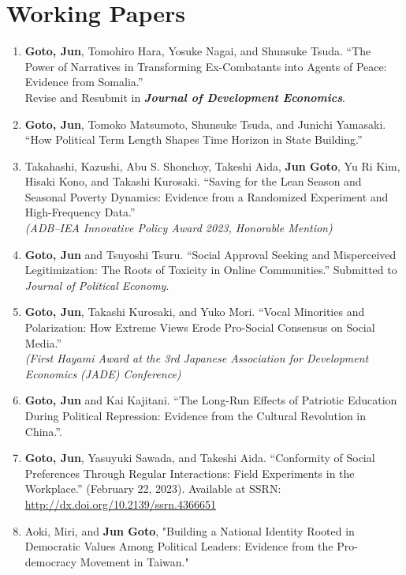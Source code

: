 \documentclass[12pt]{article}
\begin{document}
\section*{Working Papers}
\begin{enumerate}
    \item \textbf{Goto, Jun}, Tomohiro Hara, Yosuke Nagai, and Shunsuke Tsuda.
    ``The Power of Narratives in Transforming Ex-Combatants into Agents of Peace: Evidence from Somalia.'' \\
    Revise and Resubmit in \textbf{\textit{Journal of Development Economics}}.

    \item \textbf{Goto, Jun}, Tomoko Matsumoto, Shunsuke Tsuda, and Junichi Yamasaki.
    ``How Political Term Length Shapes Time Horizon in State Building.''

    \item Takahashi, Kazushi, Abu S. Shonchoy, Takeshi Aida, \textbf{Jun Goto}, Yu Ri Kim, Hisaki Kono, and Takashi Kurosaki. 
    ``Saving for the Lean Season and Seasonal Poverty Dynamics: Evidence from a Randomized Experiment and High-Frequency Data.'' \\
    \textit{(ADB--IEA Innovative Policy Award 2023, Honorable Mention)}

    \item \textbf{Goto, Jun} and Tsuyoshi Tsuru. 
    ``Social Approval Seeking and Misperceived Legitimization: The Roots of Toxicity in Online Communities.'' 
    Submitted to \textit{Journal of Political Economy}.

    \item \textbf{Goto, Jun}, Takashi Kurosaki, and Yuko Mori. 
    ``Vocal Minorities and Polarization: How Extreme Views Erode Pro-Social Consensus on Social Media.'' \\
    \textit{(First Hayami Award at the 3rd Japanese Association for Development Economics (JADE) Conference)}

    \item \textbf{Goto, Jun} and Kai Kajitani. 
    ``The Long-Run Effects of Patriotic Education During Political Repression: Evidence from the Cultural Revolution in China.''.

    \item \textbf{Goto, Jun}, Yasuyuki Sawada, and Takeshi Aida. 
    ``Conformity of Social Preferences Through Regular Interactions: Field Experiments in the Workplace.'' 
    (February 22, 2023). Available at SSRN: \href{http://dx.doi.org/10.2139/ssrn.4366651}{http://dx.doi.org/10.2139/ssrn.4366651}

    \item Aoki, Miri, and \textbf{Jun Goto}, "Building a National Identity Rooted in Democratic Values Among Political Leaders: Evidence from the Pro-democracy Movement in Taiwan."
\end{enumerate}
\end{document}
